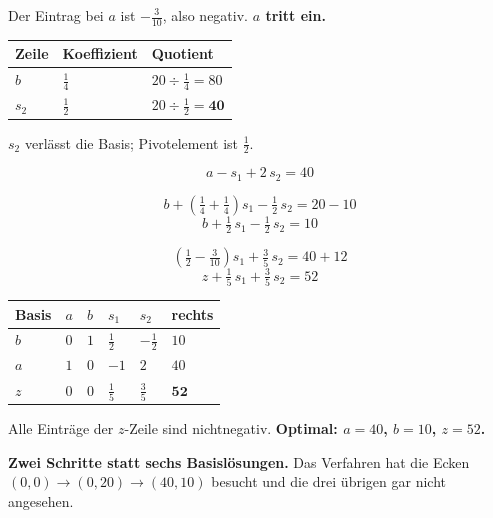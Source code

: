 \begin{merksatz}
Der Eintrag bei $a$ ist $-\frac{3}{10}$, also negativ. \textbf{$a$ tritt ein.}

\begin{center}
\renewcommand{\arraystretch}{1.5}
\begin{tabular}{@{}P{2.0cm}P{2.4cm}P{2.8cm}@{}}
\toprule
\textbf{Zeile} & \textbf{Koeffizient} & \textbf{Quotient}\\
\midrule
$b$ & $\tfrac14$ & $20 \div \tfrac14 = 80$\\
$s_2$ & $\tfrac12$ & $20 \div \tfrac12 = \mathbf{40}$\\
\bottomrule
\end{tabular}
\end{center}

$s_2$ verlässt die Basis; Pivotelement ist $\frac12$.

\[ a - s_1 + 2\,s_2 = 40 \]

\[ b + \left(\tfrac14 + \tfrac14\right)s_1 - \tfrac12\,s_2 = 20 - 10 \]
\[ b + \tfrac12\,s_1 - \tfrac12\,s_2 = 10 \]

\[ \left(\tfrac12 - \tfrac{3}{10}\right)s_1 + \tfrac{3}{5}\,s_2 = 40 + 12 \]
\[ z + \tfrac15\,s_1 + \tfrac35\,s_2 = 52 \]

\begin{center}
{\small
\renewcommand{\arraystretch}{1.5}
\begin{tabular}{@{}P{1.6cm}P{1.4cm}P{1.4cm}P{1.4cm}P{1.4cm}P{1.4cm}@{}}
\toprule
\textbf{Basis} & $a$ & $b$ & $s_1$ & $s_2$ & \textbf{rechts}\\
\midrule
$b$ & $0$ & $1$ & $\tfrac12$ & $-\tfrac12$ & $10$\\
$a$ & $1$ & $0$ & $-1$ & $2$ & $40$\\
\midrule
$z$ & $0$ & $0$ & $\tfrac15$ & $\tfrac35$ & $\mathbf{52}$\\
\bottomrule
\end{tabular}}
\end{center}

Alle Einträge der $z$-Zeile sind nichtnegativ. \textbf{Optimal: $a=40$, $b=10$, $z=52$.}

\begin{center}
\begin{minipage}{0.9\textwidth}
\textbf{Zwei Schritte statt sechs Basislösungen.} Das Verfahren hat die Ecken $(0,0) \to (0,20) \to (40,10)$ besucht und die drei übrigen gar nicht angesehen.
\end{minipage}
\end{center}
\end{merksatz}

